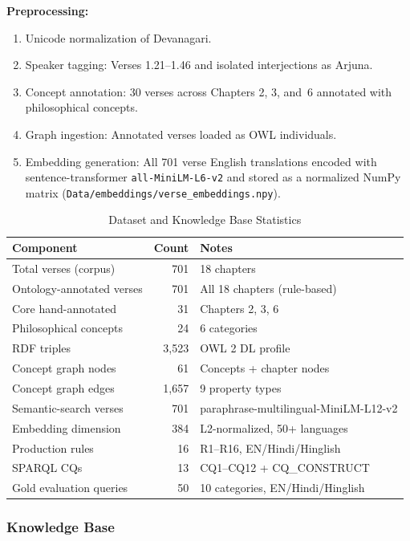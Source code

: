 \documentclass[conference]{IEEEtran}
\begin{document}
\textbf{Preprocessing:}
\begin{enumerate}[leftmargin=*]
  \item Unicode normalization of Devanagari.
  \item Speaker tagging: Verses 1.21--1.46 and isolated interjections as Arjuna.
  \item Concept annotation: 30 verses across Chapters 2, 3, and~6 annotated
        with philosophical concepts.
  \item Graph ingestion: Annotated verses loaded as OWL individuals.
  \item Embedding generation: All 701 verse English translations encoded with
        sentence-transformer \texttt{all-MiniLM-L6-v2} and stored as a normalized NumPy matrix (\texttt{Data/embeddings/verse\_embeddings.npy}).
\end{enumerate}

\begin{table}[htbp]
\caption{Dataset and Knowledge Base Statistics}
\label{tab:dataset}
\centering
\begin{tabular}{lrp{2.8cm}}
\toprule
\textbf{Component} & \textbf{Count} & \textbf{Notes} \\
\midrule
Total verses (corpus) & 701 & 18 chapters \\
Ontology-annotated verses & 701 & All 18 chapters (rule-based) \\
\quad Core hand-annotated & 31 & Chapters 2, 3, 6 \\
Philosophical concepts & 24 & 6 categories \\
RDF triples & 3,523 & OWL 2 DL profile \\
Concept graph nodes & 61 & Concepts + chapter nodes \\
Concept graph edges & 1,657 & 9 property types \\
Semantic-search verses & 701 & paraphrase-multilingual-MiniLM-L12-v2 \\
Embedding dimension & 384 & L2-normalized, 50+ languages \\
Production rules & 16 & R1--R16, EN/Hindi/Hinglish \\
SPARQL CQs & 13 & CQ1--CQ12 + CQ\_CONSTRUCT \\
Gold evaluation queries & 50 & 10 categories, EN/Hindi/Hinglish \\
\bottomrule
\end{tabular}
\end{table}

\subsubsection{Knowledge Base}
\end{document}

